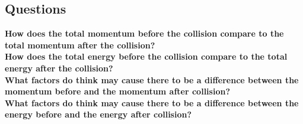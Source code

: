 \documentclass[11pt, letterpaper, includehead]{article}
\begin{document}
\subsection{Questions}
\textbf{How does the total momentum before the collision compare to the total
momentum after the collision?}\\

\textbf{How does the total energy before the collision compare to the total energy
after the collision?}\\

\textbf{What factors do think may cause there to be a difference between the
momentum before and the momentum after collision?}\\

\textbf{What factors do think may cause there to be a difference between the energy
before and the energy after collision?}\\
\end{document}
